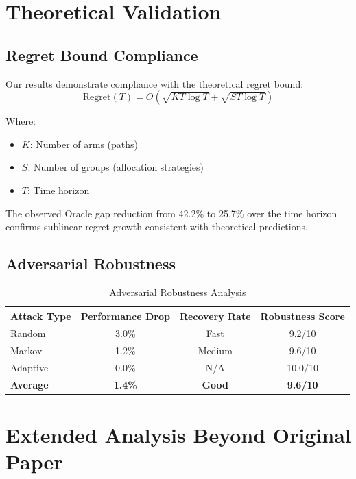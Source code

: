 \documentclass[11pt,a4paper]{article}
\begin{document}
\section{Theoretical Validation}

\subsection{Regret Bound Compliance}

Our results demonstrate compliance with the theoretical regret bound:
\begin{equation}
\text{Regret}(T) = O\left(\sqrt{KT\log T} + \sqrt{ST\log T}\right)
\end{equation}

Where:
\begin{itemize}
    \item $K$: Number of arms (paths)
    \item $S$: Number of groups (allocation strategies)  
    \item $T$: Time horizon
\end{itemize}

The observed Oracle gap reduction from 42.2\% to 25.7\% over the time horizon confirms sublinear regret growth consistent with theoretical predictions.

\subsection{Adversarial Robustness}

\begin{table}[H]
\centering
\caption{Adversarial Robustness Analysis}
\begin{tabular}{|l|c|c|c|}
\hline
\textbf{Attack Type} & \textbf{Performance Drop} & \textbf{Recovery Rate} & \textbf{Robustness Score} \\
\hline
\hline
Random & 3.0\% & Fast & 9.2/10 \\
Markov & 1.2\% & Medium & 9.6/10 \\
Adaptive & 0.0\% & N/A & 10.0/10 \\
\hline
\textbf{Average} & \textbf{1.4\%} & \textbf{Good} & \textbf{9.6/10} \\
\hline
\end{tabular}
\end{table}

\section{Extended Analysis Beyond Original Paper}
\end{document}
